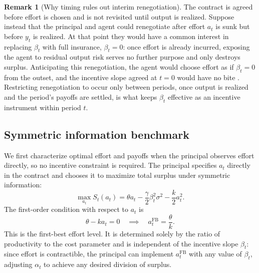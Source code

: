 \documentclass{article}
\theoremstyle{definition}
\newtheorem{remark}{Remark}[section]
\theoremstyle{plain}
\begin{document}
\begin{remark}[Why timing rules out interim renegotiation]\label{rem:renegotiation}
The contract is agreed before effort is chosen and is not revisited until output is realized. Suppose instead that the principal and agent could renegotiate after effort $a_t$ is sunk but before $y_t$ is realized. At that point they would have a common interest in replacing $\beta_t$ with full insurance, $\beta_t=0$: once effort is already incurred, exposing the agent to residual output risk serves no further purpose and only destroys surplus. Anticipating this renegotiation, the agent would choose effort as if $\beta_t=0$ from the outset, and the incentive slope agreed at $t=0$ would have no bite \parencite{ohlendorf2008}. Restricting renegotiation to occur only between periods, once output is realized and the period's payoffs are settled, is what keeps $\beta_t$ effective as an incentive instrument within period $t$.
\end{remark}

\subsection{Symmetric information benchmark}\label{subsec:symmetric}

We first characterize optimal effort and payoffs when the principal observes effort directly, so no incentive constraint is required. The principal specifies $a_t$ directly in the contract and chooses it to maximize total surplus under symmetric information:
\[
\max_{a_t} S_t(a_t) = \theta a_t - \frac{\gamma}{2}\beta_t^2 \sigma^2 - \frac{k}{2}a_t^2.
\]
The first-order condition with respect to $a_t$ is
\[
\theta - k a_t = 0 \quad \implies \quad a_t^{\text{FB}} = \frac{\theta}{k}.
\]
This is the first-best effort level. It is determined solely by the ratio of productivity to the cost parameter and is independent of the incentive slope $\beta_t$: since effort is contractible, the principal can implement $a_t^{\text{FB}}$ with any value of $\beta_t$, adjusting $\alpha_t$ to achieve any desired division of surplus.
\end{document}
